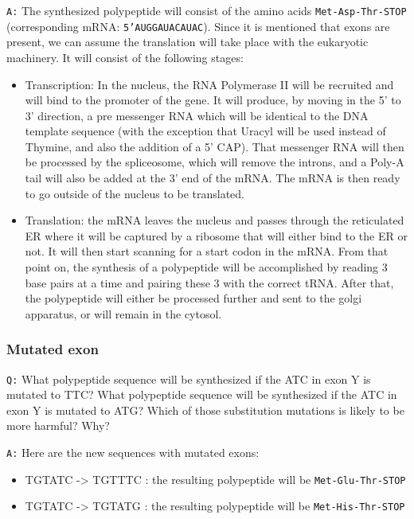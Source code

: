 \documentclass[11pt, a4paper,titlepage]{article}
\begin{document}
\texttt{A:} The synthesized polypeptide will consist of the amino acids
\texttt{Met-Asp-Thr-STOP} (corresponding mRNA: \texttt{5'AUGGAUACAUAC}). Since it is
mentioned that exons are present, we can assume the translation will
take place with the eukaryotic machinery. It will consist of the
following stages:

\begin{itemize}
\item Transcription: In the nucleus, the RNA Polymerase II will be
  recruited and will bind to the promoter of the gene. It will
  produce, by moving in the 5' to 3' direction, a pre messenger RNA
  which will be identical to the DNA template sequence (with the
  exception that Uracyl will be used instead of Thymine, and also the
  addition of a 5' CAP). That messenger RNA will then be processed by
  the spliceosome, which will remove the introns, and a Poly-A tail
  will also be added at the 3' end of the mRNA. The mRNA is then
  ready to go outside of the nucleus to be translated.
\item Translation: the mRNA leaves the nucleus and passes through the
  reticulated ER where it will be captured by a ribosome that will
  either bind to the ER or not. It will then start scanning for a
  start codon in the mRNA. From that point on, the synthesis of a
  polypeptide will be accomplished by reading 3 base pairs at a time
  and pairing these 3 with the correct tRNA. After that, the
  polypeptide will either be processed further and sent to the golgi
  apparatus, or will remain in the cytosol.
\end{itemize}
\subsubsection{Mutated exon}
\label{sec-1-2-3}

\texttt{Q:} What polypeptide sequence will be synthesized if the ATC in exon
Y is mutated to TTC? What polypeptide sequence will be synthesized if
the ATC in exon Y is mutated to ATG? Which of those substitution
mutations is likely to be more harmful? Why?

\texttt{A:} Here are the new sequences with mutated exons:

\begin{itemize}
\item TGTATC -> TGTTTC : the resulting polypeptide will be \texttt{Met-Glu-Thr-STOP}
\item TGTATC -> TGTATG : the resulting polypeptide will be \texttt{Met-His-Thr-STOP}
\end{itemize}
\end{document}

